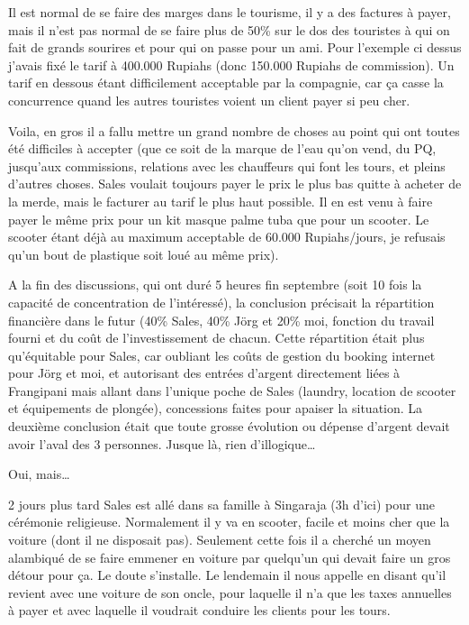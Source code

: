 Il est normal de se faire des marges dans le tourisme, il y a des factures à payer, mais il n’est pas normal de se faire plus de 50\% sur le dos des touristes à qui on fait de grands sourires et pour qui on passe pour un ami. Pour l’exemple ci dessus j’avais fixé le tarif à 400.000 Rupiahs (donc 150.000 Rupiahs de commission). Un tarif en dessous étant difficilement acceptable par la compagnie, car ça casse la concurrence quand les autres touristes voient un client payer si peu cher.

Voila, en gros il a fallu mettre un grand nombre de choses au point qui ont toutes été difficiles à accepter (que ce soit de la marque de l’eau qu’on vend, du PQ, jusqu’aux commissions, relations avec les chauffeurs qui font les tours, et pleins d’autres choses. Sales voulait toujours payer le prix le plus bas quitte à acheter de la merde, mais le facturer au tarif le plus haut possible. Il en est venu à faire payer le même prix pour un kit masque palme tuba que pour un scooter. Le scooter étant déjà au maximum acceptable de 60.000 Rupiahs/jours, je refusais qu’un bout de plastique soit loué au même prix).

A la fin des discussions, qui ont duré 5 heures fin septembre (soit 10 fois la capacité de concentration de l’intéressé), la conclusion précisait la répartition financière dans le futur (40\% Sales, 40\% Jörg et 20\% moi, fonction du travail fourni et du coût de l’investissement de chacun. Cette répartition était plus qu’équitable pour Sales, car oubliant les coûts de gestion du booking internet pour Jörg et moi, et autorisant des entrées d’argent directement liées à Frangipani mais allant dans l’unique poche de Sales (laundry, location de scooter et équipements de plongée), concessions faites pour apaiser la situation. La deuxième conclusion était que toute grosse évolution ou dépense d’argent devait avoir l’aval des 3 personnes. Jusque là, rien d’illogique…

Oui, mais…

2 jours plus tard Sales est allé dans sa famille à Singaraja (3h d’ici) pour une cérémonie religieuse. Normalement il y va en scooter, facile et moins cher que la voiture (dont il ne disposait pas). Seulement cette fois il a cherché un moyen alambiqué de se faire emmener en voiture par quelqu’un qui devait faire un gros détour pour ça. Le doute s’installe. Le lendemain il nous appelle en disant qu’il revient avec une voiture de son oncle, pour laquelle il n’a que les taxes annuelles à payer et avec laquelle il voudrait conduire les clients pour les tours.

